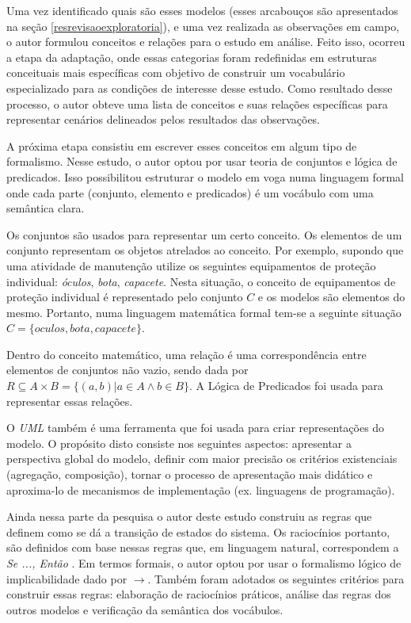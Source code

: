 Uma vez identificado quais são esses modelos (esses arcabouços são apresentados na seção \ref{resrevisaoexploratoria}), e uma vez realizada as observações em campo, o autor formulou conceitos e relações para o estudo em análise. Feito isso, ocorreu a etapa da adaptação, onde essas categorias foram redefinidas em estruturas conceituais mais específicas com objetivo de construir um vocabulário especializado para as condições de interesse desse estudo. Como resultado desse processo, o autor obteve uma lista de conceitos e suas relações específicas para representar cenários delineados pelos resultados das observações. 

A próxima etapa consistiu em escrever esses conceitos em algum tipo de formalismo. Nesse estudo, o autor optou por usar teoria de conjuntos e lógica de predicados. Isso possibilitou estruturar o modelo em voga numa linguagem formal onde cada parte (conjunto, elemento e predicados) é um vocábulo com uma semântica clara. 

Os conjuntos são usados para representar um certo conceito. Os elementos de um conjunto representam os objetos atrelados ao conceito. Por exemplo, supondo que uma atividade de manutenção utilize os seguintes equipamentos de proteção individual: \textit{óculos}, \textit{bota}, \textit{capacete}.
Nesta situação, o conceito de equipamentos de proteção individual é representado pelo conjunto $C$ e os modelos são elementos do mesmo. Portanto, numa linguagem matemática formal tem-se a seguinte situação $C = \{oculos,bota,capacete\}$. 

Dentro do conceito matemático, uma relação é uma correspondência entre elementos de conjuntos não vazio, sendo dada por $R \subseteq  A \times B = \{(a,b)| a \in A \wedge b \in B \}$. A Lógica de Predicados foi usada para representar essas
relações.

O \textit{UML} também é uma ferramenta que foi usada para criar representações do modelo. O propósito disto consiste nos seguintes aspectos: apresentar a perspectiva global do modelo, definir com maior precisão os critérios existenciais (agregação, composição), tornar o processo de apresentação mais didático e aproxima-lo de mecanismos de implementação (ex. linguagens de programação). 

Ainda nessa parte da pesquisa o autor deste estudo construiu as regras que definem como se dá a transição de estados do sistema. Os raciocínios portanto, são definidos com base nessas regras que, em linguagem natural, correspondem a \textit{Se ..., Então }. Em termos formais, o autor optou por usar o formalismo lógico de implicabilidade dado por $\to$. Também foram adotados os seguintes critérios para construir essas regras: elaboração de raciocínios práticos, análise das regras dos outros modelos e verificação da semântica dos vocábulos.